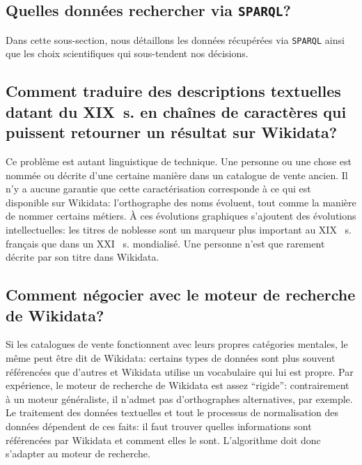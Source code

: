 \documentclass[a4paper, 12pt, twoside]{book}
\newcommand{\siecle}[1]{%
	#1%
	\ifthenelse{\equal{#1}{I}}{\up{er}}{\up{ème}}%
	~s.%
}
\newcommand{\sparql}{\texttt{SPARQL}}
\begin{document}
\subsection{Quelles données rechercher via \sparql?}
Dans cette sous-section, nous détaillons les données récupérées via \sparql{} ainsi que les choix scientifiques qui sous-tendent nos décisions.

\subsection{Comment traduire des descriptions textuelles datant du XIX~s. en chaînes de caractères qui puissent retourner un résultat sur Wikidata?} 
Ce problème est autant linguistique de technique. Une personne ou une chose est nommée ou décrite d'une certaine manière dans un catalogue de vente ancien. Il n'y a aucune garantie que cette caractérisation corresponde à ce qui est disponible sur Wikidata: l'orthographe des noms évoluent, tout comme la manière de nommer certains métiers. À ces évolutions graphiques s'ajoutent des évolutions intellectuelles: les titres de noblesse sont un marqueur plus important au \siecle{XIX} français que dans un \siecle{XXI} mondialisé. Une personne n'est que rarement décrite par son titre dans Wikidata.

\subsection{Comment négocier avec le moteur de recherche de Wikidata?} 
Si les catalogues de vente fonctionnent avec leurs propres catégories mentales, le même peut être dit de Wikidata: certains types de données sont plus souvent référencées que d'autres et Wikidata utilise un vocabulaire qui lui est propre. Par expérience, le moteur de recherche de Wikidata est assez \enquote{rigide}: contrairement à un moteur généraliste, il n'admet pas d'orthographes alternatives, par exemple. Le traitement des données textuelles et tout le processus de normalisation des données dépendent de ces faits: il faut trouver quelles informations sont référencées par Wikidata et comment elles le sont. L'algorithme doit donc s'adapter au moteur de recherche. 
\end{document}
